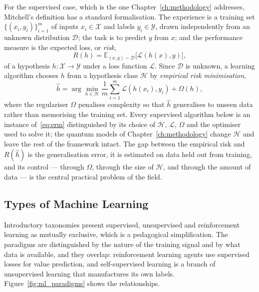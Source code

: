 For the supervised case, which is the one Chapter~\ref{ch:methodology}
addresses, Mitchell's definition has a standard formalisation. The experience
is a training set $\{(x_i, y_i)\}_{i=1}^{m}$ of inputs $x_i \in \mathcal{X}$
and labels $y_i \in \mathcal{Y}$, drawn independently from an unknown
distribution $\mathcal{D}$; the task is to predict $y$ from $x$; and the
performance measure is the expected loss, or \emph{risk},
\begin{equation}
	R(h) = \mathbb{E}_{(x, y) \sim \mathcal{D}} \bigl[ \mathcal{L}(h(x), y) \bigr],
\end{equation}
of a hypothesis $h : \mathcal{X} \to \mathcal{Y}$ under a loss function
$\mathcal{L}$. Since $\mathcal{D}$ is unknown, a learning algorithm chooses
$h$ from a hypothesis class $\mathcal{H}$ by \emph{empirical risk
minimisation},
\begin{equation}
	\hat{h} = \arg\min_{h \in \mathcal{H}} \frac{1}{m} \sum_{i=1}^{m} \mathcal{L}(h(x_i), y_i) + \Omega(h),
	\label{eq:erm}
\end{equation}
where the regulariser $\Omega$ penalises complexity so that $\hat{h}$
generalises to unseen data rather than memorising the training set. Every
supervised algorithm below is an instance of~\eqref{eq:erm} distinguished by
its choice of $\mathcal{H}$, $\mathcal{L}$, $\Omega$ and the optimiser used
to solve it; the quantum models of Chapter~\ref{ch:methodology} change
$\mathcal{H}$ and leave the rest of the framework intact. The gap between
the empirical risk and $R(\hat{h})$ is the generalisation error, it is
estimated on data held out from training, and its control --- through
$\Omega$, through the size of $\mathcal{H}$, and through the amount of data
--- is the central practical problem of the field.

\subsection{Types of Machine Learning}
Introductory taxonomies present supervised, unsupervised and reinforcement
learning as mutually exclusive, which is a pedagogical simplification. The
paradigms are distinguished by the nature of the training signal and by what
data is available, and they overlap: reinforcement learning agents use
supervised losses for value prediction, and self-supervised learning is a
branch of unsupervised learning that manufactures its own labels.
Figure~\ref{fig:ml_paradigms} shows the relationships.

